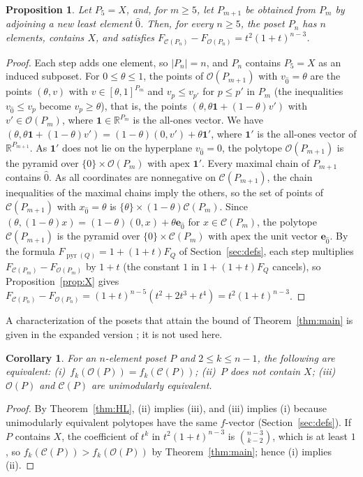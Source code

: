 \documentclass[11pt]{article}
\newtheorem{proposition}[theorem]{Proposition}
\newtheorem{corollary}[theorem]{Corollary}
\theoremstyle{definition}
\theoremstyle{remark}
\newcommand{\OO}{\mathcal O}
\newcommand{\CC}{\mathcal C}
\newcommand{\pyr}{\operatorname{pyr}}
\begin{document}
\begin{proposition}\label{prop:sharp}
Let $P_5=X$, and, for $m\geq5$, let $P_{m+1}$ be obtained from $P_m$ by adjoining a new least element $\hat0$. Then, for every
$n\geq5$, the poset $P_n$ has $n$ elements, contains $X$, and satisfies
$F_{\CC(P_n)}-F_{\OO(P_n)}=t^2(1+t)^{n-3}$.
\end{proposition}
\begin{proof}
Each step adds one element, so $|P_n|=n$, and $P_n$ contains $P_5=X$ as an induced subposet. For
$0\leq\theta\leq1$, the points of $\OO(P_{m+1})$ with $v_{\hat0}=\theta$ are the points $(\theta,v)$ with
$v\in[\theta,1]^{P_m}$ and $v_p\leq v_{p'}$ for $p\leq p'$ in $P_m$ (the inequalities $v_{\hat0}\leq v_p$ become $v_p\geq\theta$), that is, the points $(\theta,\theta\mathbf1+(1-\theta)v')$ with $v'\in\OO(P_m)$, where
$\mathbf1\in\mathbb R^{P_m}$ is the all-ones vector. We have $(\theta,\theta\mathbf1+(1-\theta)v')=(1-\theta)(0,v')+\theta\mathbf1'$, where $\mathbf1'$ is the all-ones vector of $\mathbb R^{P_{m+1}}$. As $\mathbf1'$ does not lie on the hyperplane $v_{\hat0}=0$, the polytope $\OO(P_{m+1})$ is the pyramid over $\{0\}\times\OO(P_m)$ with apex $\mathbf1'$. Every maximal chain of $P_{m+1}$ contains $\hat0$. As all coordinates are nonnegative on $\CC(P_{m+1})$, the chain inequalities of the maximal chains imply the others, so the set of points of $\CC(P_{m+1})$ with $x_{\hat0}=\theta$ is $\{\theta\}\times(1-\theta)\CC(P_m)$. Since $(\theta,(1-\theta)x)=(1-\theta)(0,x)+\theta\mathbf e_{\hat0}$ for $x\in\CC(P_m)$, the polytope $\CC(P_{m+1})$ is the pyramid over $\{0\}\times\CC(P_m)$ with apex the unit vector $\mathbf e_{\hat0}$.
By the formula $F_{\pyr(Q)}=1+(1+t)F_Q$ of Section~\ref{sec:defs}, each step multiplies $F_{\CC(P_m)}-F_{\OO(P_m)}$ by
$1+t$ (the constant $1$ in $1+(1+t)F_Q$ cancels), so Proposition~\ref{prop:X} gives
$F_{\CC(P_n)}-F_{\OO(P_n)}=(1+t)^{n-5}(t^2+2t^3+t^4)=t^2(1+t)^{n-3}$.
\end{proof}
A characterization of the posets that attain the bound of Theorem~\ref{thm:main} is given in the expanded
version \cite[Theorem~6.1]{G}; it is not used here.

\begin{corollary}\label{cor:equality}
For an $n$-element poset $P$ and $2\leq k\leq n-1$, the following are
equivalent: (i)~$f_k(\OO(P))=f_k(\CC(P))$; (ii)~$P$
does not contain $X$; (iii)~$\OO(P)$ and $\CC(P)$ are unimodularly
equivalent.
\end{corollary}
\begin{proof}
By Theorem~\ref{thm:HL}, (ii) implies (iii), and
(iii) implies (i) because unimodularly equivalent polytopes have
the same $f$-vector (Section~\ref{sec:defs}). If $P$ contains $X$, the
coefficient of $t^k$ in $t^2(1+t)^{n-3}$ is $\binom{n-3}{k-2}$, which is at least $1$, so
$f_k(\CC(P))>f_k(\OO(P))$ by Theorem~\ref{thm:main}; hence (i) implies (ii).
\end{proof}
\end{document}
